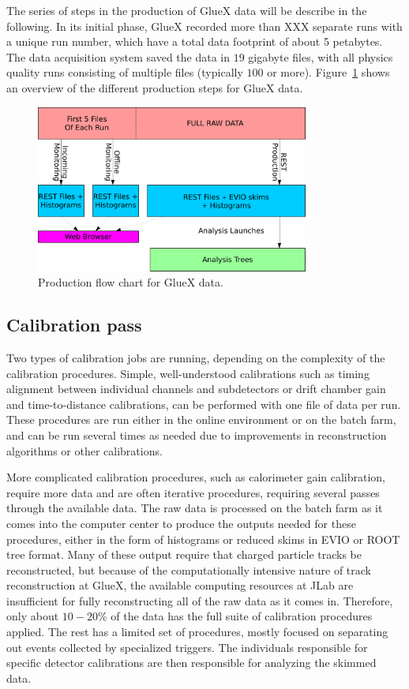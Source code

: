 The series of steps in the production of GlueX data will be describe in the following. In its initial phase, GlueX recorded more than XXX separate runs with a unique run number, which have a total data footprint of about 5 petabytes. The data acquisition system saved the data in $19$ gigabyte files, with all physics quality runs consisting of multiple files (typically $100$ or more). Figure~\ref{fig:production_overview} shows an overview of the different production steps for GlueX data. 

\begin{figure}[h!]\centering
\includegraphics[width=0.8\textwidth]{figures/Production_generic.pdf}
\caption[]{\label{fig:production_overview}Production flow chart for GlueX data.} 
\end{figure}

\subsection{Calibration pass \label{sec:reccalibration}}

Two types of calibration jobs are running, depending on the complexity of the calibration procedures.  Simple, well-understood calibrations such as timing alignment between individual channels and subdetectors or drift chamber gain and time-to-distance calibrations, can be performed with one file of data per run.  These procedures are run either in the online environment or on the batch farm, and can be run several times as needed due to improvements in reconstruction algorithms or other calibrations.

More complicated calibration procedures, such as calorimeter gain calibration, require more data and are often iterative procedures, requiring several passes through the available data.  The raw data is processed on the batch farm as it comes into the computer center to produce the outputs needed for these procedures, either in the form of histograms or reduced skims in EVIO or ROOT tree format.  Many of these output require that charged particle tracks be reconstructed, but because of the computationally intensive nature of track reconstruction at GlueX, the available computing resources at JLab are insufficient for fully reconstructing all of the raw data as it comes in.  Therefore, only about $10-20$\% of the data has the full suite of calibration procedures applied.  The rest has a limited set of procedures, mostly focused on separating out events collected by specialized triggers. 
The individuals responsible for specific detector calibrations are then responsible for analyzing the skimmed data.

